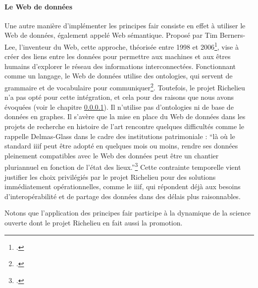 \paragraph{Le Web de données}
Une autre manière d'implémenter les principes \acrshort{fair} consiste en effet à utiliser le Web de données, également appelé Web sémantique. Proposé par Tim Berners-Lee, l'inventeur du Web, cette approche, théorisée entre 1998 et 2006\footcite{BERNERS-LEELinked2009}, vise à créer des liens entre les données pour permettre aux machines et aux êtres humains d'explorer le réseau des informations interconnectées. Fonctionnant comme un langage, le Web de données utilise des ontologies, qui servent de grammaire et de vocabulaire pour communiquer\footcite{BERMEStechnologies2013}. Toutefois, le projet Richelieu n'a pas opté pour cette intégration, et cela pour des raisons que nous avons évoquées (voir le chapitre \ref{}). Il n'utilise pas d'ontologies ni de base de données en graphes. Il s'avère que la mise en place du Web de données dans les projets de recherche en histoire de l'art rencontre quelques difficultés comme le rappelle Delmas-Glass dans le cadre des institutions patrimoniale : \enquote{là où le standard \acrshort{iiif} peut être adopté en quelques mois ou moins, rendre ses données pleinement compatibles avec le Web des données peut être un chantier pluriannuel en fonction de l’état des lieux.}\footcite{DELMAS-GLASSHumanites2021} Cette contrainte temporelle vient justifier les choix privilégiés par le projet Richelieu pour des solutions immédiatement opérationnelles, comme le \acrshort{iiif}, qui répondent déjà aux besoins d'interopérabilité et de partage des données dans des délais plus raisonnables.

Notons que l'application des principes \acrshort{fair} participe à la dynamique de la science ouverte dont le projet Richelieu en fait aussi la promotion. 

